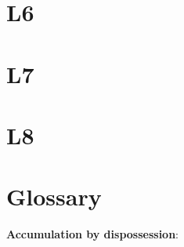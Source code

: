 \documentclass{article}
\begin{document}
\pagebreak
\section{L6}

\textbf{}

\textbf{}

\textbf{}

\textbf{}

\textbf{}

\textbf{}

\textbf{}

\textbf{}

\textbf{}

\textbf{}

\textbf{}

\pagebreak
\section{L7}

\textbf{}

\textbf{}

\textbf{}

\textbf{}


\textbf{}

\textbf{}

\textbf{}

\textbf{}

\textbf{}

\textbf{}

\textbf{}

\pagebreak
\section{L8}


\textbf{}

\textbf{}

\textbf{}

\textbf{}

\textbf{}

\textbf{}

\textbf{}

\textbf{}

\textbf{}

\textbf{}

\textbf{}

\section{Glossary}

\textbf{Accumulation by dispossession}:
\end{document}
